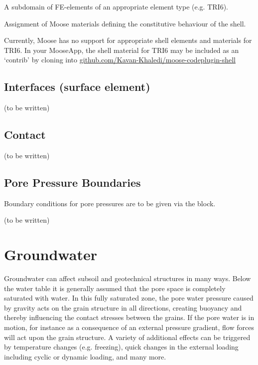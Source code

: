 \begin{description}[font=$\bullet$~\normalfont]
  \item [subdomain:] A subdomain of FE-elements of an appropriate element type (e.g. TRI6).
  \item [materials:] Assignment of Moose materials defining the constitutive behaviour of the shell.
\end{description}

Currently, Moose has no support for appropriate shell elements and materials
for TRI6. In your MooseApp, the shell material for TRI6 may be included as an
‘contrib’ by cloning into
\href{https://github.com/Kavan-Khaledi/moose-codeplugin-shell}{github.com/Kavan-Khaledi/moose-codeplugin-shell}

\subsection{\todomarker Interfaces (surface element)}

(to be written)

\subsection{\todomarker Contact}

(to be written)

\subsection{Pore Pressure Boundaries}

Boundary conditions for pore pressures are to be given via the \codeword{[BCs]}
block.



(to be written)

\section{Groundwater}
\label{chap:entities-groundwater}

Groundwater can affect subsoil and geotechnical structures in many ways. Below
the water table it is generally assumed that the pore space is completely
saturated with water. In this fully saturated zone, the pore water pressure
caused by gravity acts on the grain structure in all directions, creating
buoyancy and thereby influencing the contact stresses between the grains. If
the pore water is in motion, for instance as a consequence of an external
pressure gradient, flow forces will act upon the grain structure. A variety of
additional effects can be triggered by temperature changes (e.g. freezing),
quick changes in the external loading including cyclic or dynamic loading, and
many more.

